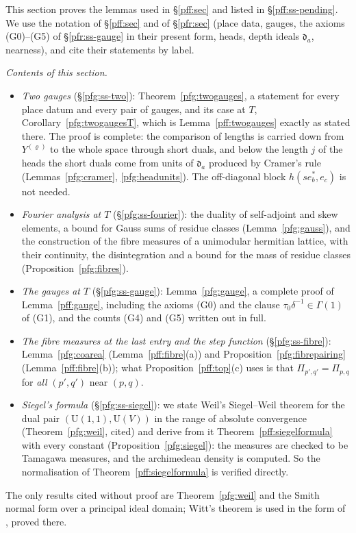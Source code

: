 \documentclass[10pt]{amsart}
\theoremstyle{definition}
\theoremstyle{remark}
\providecommand{\auU}{\mathrm U}
\begin{document}
This section proves the lemmas used in \S\ref{pff:sec} and listed in \S\ref{pff:ss-pending}. We use the
notation of \S\ref{pff:sec} and of \S\ref{pfr:sec} (place data, gauges, the axioms (G0)--(G5) of
\S\ref{pfr:ss-gauge} in their present form, heads, depth ideals $\mathfrak d_a$, nearness), and cite their
statements by label.

\emph{Contents of this section.}
\begin{itemize}
\item[(i)] \emph{Two gauges} (\S\ref{pfg:ss-two}): Theorem~\ref{pfg:twogauges}, a statement for every place
datum and every pair of gauges, and its case at $T$, Corollary~\ref{pfg:twogaugesT}, which is
Lemma~\ref{pff:twogauges} exactly as stated there. The proof is complete: the comparison of lengths is
carried down from $Y^{(\varrho)}$ to the whole space through short duals, and below the length $j$ of the
heads the short duals come from units of $\mathfrak d_a$ produced by Cramer's rule
(Lemmas~\ref{pfg:cramer}, \ref{pfg:headunits}). The off-diagonal block $h(se_b^*,e_c)$ is not needed.
\item[(ii)] \emph{Fourier analysis at $T$} (\S\ref{pfg:ss-fourier}): the duality of self-adjoint and skew
elements, a bound for Gauss sums of residue classes (Lemma~\ref{pfg:gauss}), and the construction of
the fibre measures of a unimodular hermitian lattice, with their continuity, the disintegration and a
bound for the mass of residue classes (Proposition~\ref{pfg:fibres}).
\item[(iii)] \emph{The gauges at $T$} (\S\ref{pfg:ss-gauge}): Lemma~\ref{pfg:gauge}, a complete proof of
Lemma~\ref{pff:gauge}, including the axioms (G0) and the clause $\tau_0\delta^{-1}\in\Gamma(1)$ of (G1),
and the counts (G4) and (G5) written out in full.
\item[(iv)] \emph{The fibre measures at the last entry and the step function} (\S\ref{pfg:ss-fibre}):
Lemma~\ref{pfg:coarea} (Lemma~\ref{pff:fibre}(a)) and Proposition~\ref{pfg:fibrepairing} (Lemma~\ref{pff:fibre}(b)); what
Proposition~\ref{pff:top}(c) uses is that $\Pi_{p',q'}=\Pi_{p,q}$ for \emph{all} $(p',q')$ near $(p,q)$.
\item[(v)] \emph{Siegel's formula} (\S\ref{pfg:ss-siegel}): we state Weil's Siegel--Weil theorem for the
dual pair $(\auU(1,1),\auU(V))$ in the range of absolute convergence (Theorem~\ref{pfg:weil}, cited) and
derive from it Theorem~\ref{pff:siegelformula} with every constant (Proposition~\ref{pfg:siegel}): the
measures are checked to be Tamagawa measures, and the archimedean density is computed. So the
normalisation of Theorem~\ref{pff:siegelformula} is verified directly.
\end{itemize}
The only results cited without proof are Theorem~\ref{pfg:weil} and the Smith normal form over a principal
ideal domain; Witt's theorem is used in the form of {\cite[Lemma~7.12]{P51}}, proved there.
\end{document}

